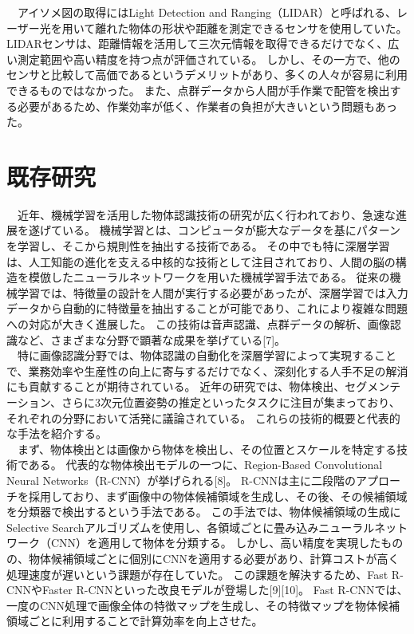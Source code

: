 　アイソメ図の取得にはLight Detection and Ranging（LIDAR）と呼ばれる、レーザー光を用いて離れた物体の形状や距離を測定できるセンサを使用していた。
LIDARセンサは、距離情報を活用して三次元情報を取得できるだけでなく、広い測定範囲や高い精度を持つ点が評価されている。
しかし、その一方で、他のセンサと比較して高価であるというデメリットがあり、多くの人々が容易に利用できるものではなかった。
また、点群データから人間が手作業で配管を検出する必要があるため、作業効率が低く、作業者の負担が大きいという問題もあった。\\

\section{既存研究}
　近年、機械学習を活用した物体認識技術の研究が広く行われており、急速な進展を遂げている。
機械学習とは、コンピュータが膨大なデータを基にパターンを学習し、そこから規則性を抽出する技術である。
その中でも特に深層学習は、人工知能の進化を支える中核的な技術として注目されており、人間の脳の構造を模倣したニューラルネットワークを用いた機械学習手法である。
従来の機械学習では、特徴量の設計を人間が実行する必要があったが、深層学習では入力データから自動的に特徴量を抽出することが可能であり、これにより複雑な問題への対応が大きく進展した。
この技術は音声認識、点群データの解析、画像認識など、さまざまな分野で顕著な成果を挙げている[7]。\\
　特に画像認識分野では、物体認識の自動化を深層学習によって実現することで、業務効率や生産性の向上に寄与するだけでなく、深刻化する人手不足の解消にも貢献することが期待されている。
近年の研究では、物体検出、セグメンテーション、さらに3次元位置姿勢の推定といったタスクに注目が集まっており、それぞれの分野において活発に議論されている。
これらの技術的概要と代表的な手法を紹介する。\\
　まず、物体検出とは画像から物体を検出し、その位置とスケールを特定する技術である。
代表的な物体検出モデルの一つに、Region-Based Convolutional Neural Networks（R-CNN）が挙げられる[8]。
R-CNNは主に二段階のアプローチを採用しており、まず画像中の物体候補領域を生成し、その後、その候補領域を分類器で検出するという手法である。
この手法では、物体候補領域の生成にSelective Searchアルゴリズムを使用し、各領域ごとに畳み込みニューラルネットワーク（CNN）を適用して物体を分類する。
しかし、高い精度を実現したものの、物体候補領域ごとに個別にCNNを適用する必要があり、計算コストが高く処理速度が遅いという課題が存在していた。
この課題を解決するため、Fast R-CNNやFaster R-CNNといった改良モデルが登場した[9][10]。
Fast R-CNNでは、一度のCNN処理で画像全体の特徴マップを生成し、その特徴マップを物体候補領域ごとに利用することで計算効率を向上させた。

